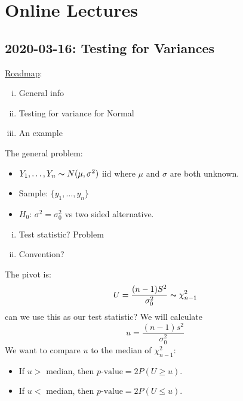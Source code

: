 \chapter{Online Lectures}
\section{2020-03-16: Testing for Variances}
\underline{Roadmap}:
\begin{enumerate}[(i)]
    \item General info
    \item Testing for variance for Normal
    \item An example
\end{enumerate}
The general problem:
\begin{itemize}
    \item $ Y_1,\ldots ,Y_n \thicksim N(\mu,\sigma^2)$ iid
          where $ \mu $ and $ \sigma $ are both unknown.
    \item Sample: $ \{y_1,\ldots ,y_n\} $
    \item $ H_0 $: $ \sigma^2=\sigma_0^2 $ vs two sided alternative.
\end{itemize}

\begin{enumerate}[(i)]
    \item Test statistic? Problem
    \item Convention?
\end{enumerate}
The pivot is:
\[ U=\frac{(n-1)S^2}{\sigma_0^2} \thicksim \chi^2_{n-1} \]
can we use this as our test statistic? We will calculate
\[ u=\frac{(n-1)s^2}{\sigma_0^2} \]
We want to compare $ u $ to the median of $ \chi^2_{n-1} $:
\begin{itemize}
    \item If $ u> $ median, then $ p\text{-value}=2P(U\geqslant u) $.
    \item If $ u< $ median, then $ p\text{-value}=2P(U\leqslant u) $.
\end{itemize}

